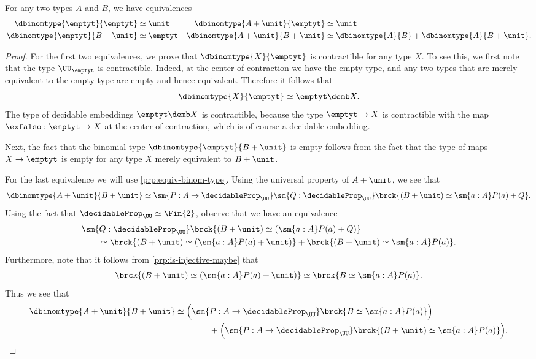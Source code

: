 \begin{lem}\label{prp:binomtype-recursion}
  For any two types $A$ and $B$, we have equivalences
  \begin{align*}
    \dbinomtype{\emptyt}{\emptyt} & \simeq \unit & \dbinomtype{A+\unit}{\emptyt} & \simeq \unit \\
    \dbinomtype{\emptyt}{B+\unit} & \simeq \emptyt & \dbinomtype{A+\unit}{B+\unit} & \simeq \dbinomtype{A}{B}+\dbinomtype{A}{B+\unit}.
  \end{align*}
\end{lem}

\begin{proof}
  For the first two equivalences, we prove that $\dbinomtype{X}{\emptyt}$ is contractible for any type $X$. To see this, we first note that the type $\UU_\emptyt$ is contractible. Indeed, at the center of contraction we have the empty type, and any two types that are merely equivalent to the empty type are empty and hence equivalent. Therefore it follows that
  \begin{equation*}
    \dbinomtype{X}{\emptyt}\simeq \emptyt\demb X.
  \end{equation*}
  The type of decidable embeddings $\emptyt\demb X$ is contractible, because the type $\emptyt\to X$ is contractible with the map $\exfalso:\emptyt\to X$ at the center of contraction, which is of course a decidable embedding.

  Next, the fact that the binomial type $\dbinomtype{\emptyt}{B+\unit}$ is empty follows from the fact that the type of maps $X\to\emptyt$ is empty for any type $X$ merely equivalent to $B+\unit$. 

  For the last equivalence we will use \cref{prp:equiv-binom-type}. Using the universal property of $A+\unit$, we see that
  \begin{equation*}
    \dbinomtype{A+\unit}{B+\unit}\simeq \sm{P:A\to\decidableProp_\UU}\sm{Q:\decidableProp_\UU}\brck{(B+\unit)\simeq \sm{a:A}P(a)+ Q}.
  \end{equation*}
  Using the fact that $\decidableProp_\UU\simeq\Fin{2}$, observe that we have an equivalence
  \begin{align*}
    & \sm{Q:\decidableProp_\UU}\brck{(B+\unit)\simeq(\sm{a:A}P(a)+Q)} \\
    & \qquad\simeq \brck{(B+\unit)\simeq(\sm{a:A}P(a)+\unit)}+\brck{(B+\unit)\simeq\sm{a:A}P(a)}.
  \end{align*}
  Furthermore, note that it follows from \cref{prp:is-injective-maybe} that
  \begin{equation*}
    \brck{(B+\unit)\simeq(\sm{a:A}P(a)+\unit)}\simeq\brck{B\simeq\sm{a:A}P(a)}.
  \end{equation*}
  Thus we see that
  \begin{align*}
    \dbinomtype{A+\unit}{B+\unit} & \simeq \Big(\sm{P:A\to\decidableProp_\UU}\brck{B\simeq\sm{a:A}P(a)}\Big) \\
    & \qquad\qquad +\Big(\sm{P:A\to\decidableProp_\UU}\brck{(B+\unit)\simeq\sm{a:A}P(a)}\Big).\qedhere
  \end{align*}
\end{proof}


